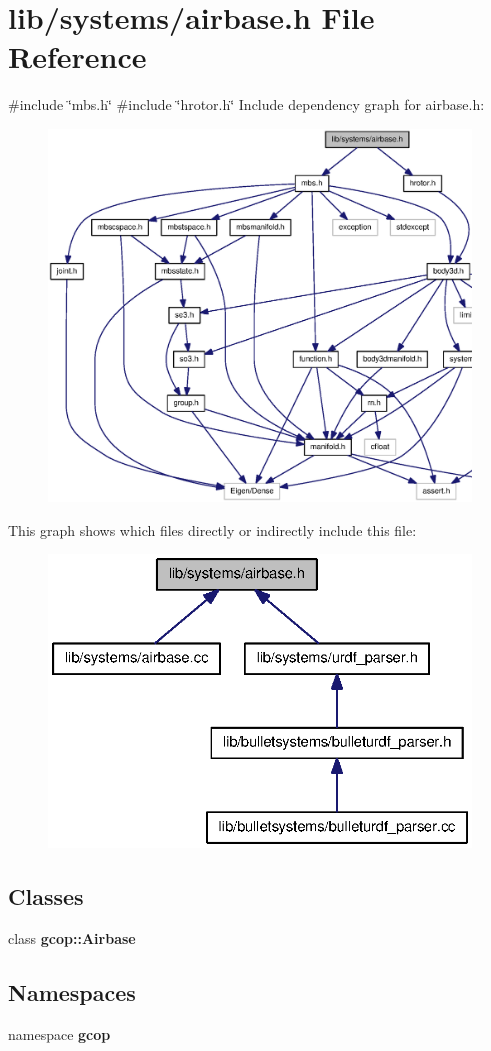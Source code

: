 \section{lib/systems/airbase.h \-File \-Reference}
\label{airbase_8h}
{\ttfamily \#include \char`\"{}mbs.\-h\char`\"{}}\*
{\ttfamily \#include \char`\"{}hrotor.\-h\char`\"{}}\*
\-Include dependency graph for airbase.\-h\-:\nopagebreak
\begin{figure}[H]
\begin{center}
\leavevmode
\includegraphics[width=350pt]{airbase_8h__incl}
\end{center}
\end{figure}
\-This graph shows which files directly or indirectly include this file\-:
\nopagebreak
\begin{figure}[H]
\begin{center}
\leavevmode
\includegraphics[width=328pt]{airbase_8h__dep__incl}
\end{center}
\end{figure}
\subsection*{\-Classes}
\begin{DoxyCompactItemize}
\item 
class {\bf gcop\-::\-Airbase}
\end{DoxyCompactItemize}
\subsection*{\-Namespaces}
\begin{DoxyCompactItemize}
\item 
namespace {\bf gcop}
\end{DoxyCompactItemize}
